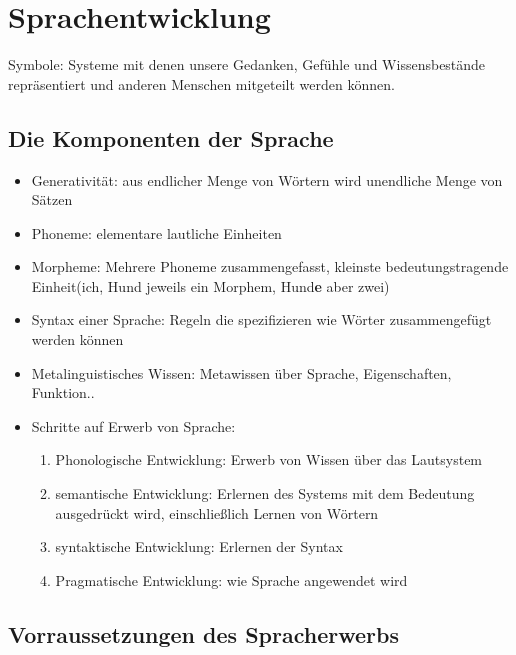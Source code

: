 \section{Sprachentwicklung}
Symbole: Systeme mit denen unsere Gedanken, Gefühle und Wissensbestände repräsentiert und anderen Menschen mitgeteilt werden können.
\subsection{Die Komponenten der Sprache}
\begin{itemize}
	\item Generativität: aus endlicher Menge von Wörtern wird unendliche Menge von Sätzen
	\item Phoneme: elementare lautliche Einheiten
	\item Morpheme: Mehrere Phoneme zusammengefasst, kleinste bedeutungstragende Einheit(ich, Hund jeweils ein Morphem, Hund\textbf{e} aber zwei)
	\item Syntax einer Sprache: Regeln die spezifizieren wie Wörter zusammengefügt werden können
	\item Metalinguistisches Wissen: Metawissen über Sprache, Eigenschaften, Funktion..
	\item Schritte auf Erwerb von Sprache:
		\begin{enumerate}
			\item Phonologische Entwicklung: Erwerb von Wissen über das Lautsystem
			\item
				semantische Entwicklung: Erlernen des Systems mit dem Bedeutung ausgedrückt wird, einschließlich Lernen von Wörtern
			\item
				syntaktische Entwicklung: Erlernen der Syntax
			\item Pragmatische Entwicklung: wie Sprache angewendet wird

		\end{enumerate}
\end{itemize}
\subsection{Vorraussetzungen des Spracherwerbs}
